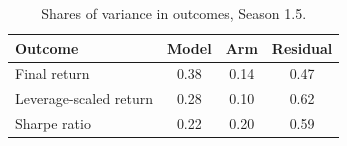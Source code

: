 \begin{table}[ht]
\centering
\small
\caption{Shares of variance in outcomes, Season 1.5.}
\label{tab:shares}
\begin{tabular}{lccc}
\toprule
Outcome & Model & Arm & Residual \\
\midrule
Final return & 0.38 & 0.14 & 0.47 \\
Leverage-scaled return & 0.28 & 0.10 & 0.62 \\
Sharpe ratio & 0.22 & 0.20 & 0.59 \\
\bottomrule
\end{tabular}
\end{table}
